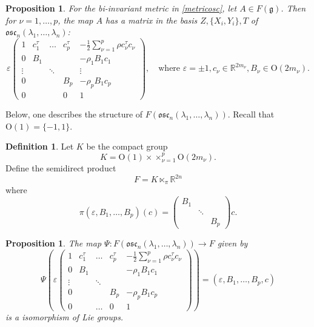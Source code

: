 \documentclass[12pt]{amsart}
\theoremstyle{plain}
\newtheorem{prop}[thm]{Proposition}
\theoremstyle{definition}
\newtheorem{defn}[thm]{Definition}
\theoremstyle{remark}
\begin{document}
    \begin{prop} For the bi-invariant metric in \eqref{metricosc}, let $A\in F(\mathfrak g)$. Then for $\nu=1, \hdots, p$, the map  $A$ has a matrix in the basis $Z, \{X_i, Y_i\}, T$ of $\mathfrak{osc}_n(\lambda_1, \hdots, \lambda_n)$:
    	$$\varepsilon  \left( 
    	\begin{matrix} 
    	 1 &	c_1^{\tau}	&\hdots  &c_p^{\tau}   &   -\frac12 \sum_{\nu=1}^p  \rho c_{\nu}^{\tau} c_{\nu}\\
    0	 &	B_1 & & &  - \rho_1 B_1 c_1\\
    \vdots	&	& \ddots &   &  \vdots\\
    0	&	& & B_p &  - \rho_p B_1 c_p\\
   0 & & & 0 & 1
    	\end{matrix}\right), \quad \mbox{where } \varepsilon=\pm 1, c_{\nu}\in \mathbb R^{2m_{\nu}}, B_{\nu}\in \mathrm{O}(2 m_{\nu}).$$
    \end{prop}

Below, one describes the structure of $F(\mathfrak{osc}_n(\lambda_1, \hdots, \lambda_n))$. Recall that $\mathrm{O}(1)=\{-1,1\}$. 

\begin{defn} Let $K$ be the compact group 
	$$K= \mathrm{O}(1)\times \times_{\nu=1}^p \mathrm{O}(2m_{\nu}).$$
	Define the semidirect product
	$$F=K\ltimes_{\pi} \mathbb R^{2n}$$
	where 
	$$\pi(\varepsilon, B_1, \hdots, B_p)(c)=\left( \begin{matrix}
	B_1  & & \\
	 & \ddots & \\
	  & & B_p
	\end{matrix} \right) c.
	$$	
	\end{defn}
\begin{prop} The map $\Psi: F(\mathfrak{osc}_n(\lambda_1, \hdots, \lambda_n)) \to F$ given by
	$$\Psi \left( \varepsilon  \left( 
	\begin{matrix} 
	1&	c_1^{\tau}	&\hdots  &c_p^{\tau}   &   -\frac12 \sum_{\nu=1}^p  \rho c_{\nu}^{\tau} c_{\nu}\\
0&	B_1 & & &  - \rho_1 B_1 c_1\\
\vdots &	& \ddots &   &  \\
0&	& & B_p &  - \rho_p B_1 c_p\\
0  & &\hdots  & 0 & 1
	\end{matrix}\right) \right) =(\varepsilon, B_1, \hdots, B_p, c)$$
	is a isomorphism of Lie groups. 
\end{prop}
\end{document}
